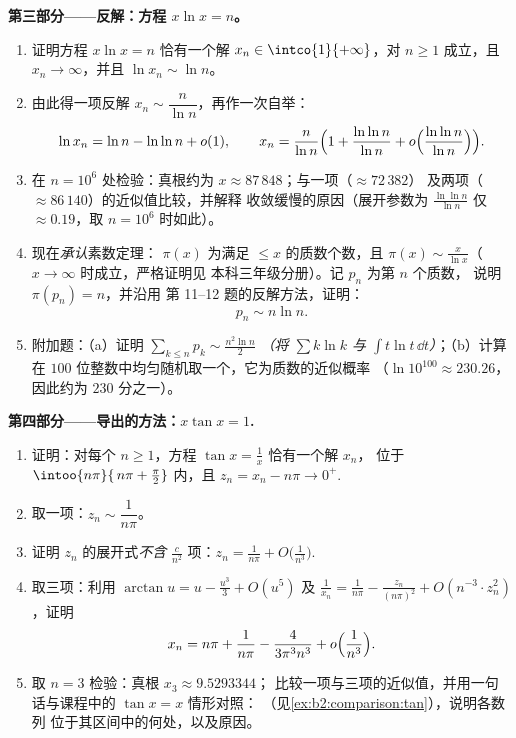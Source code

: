 \begin{problem}
\medskip
\noindent\textbf{第三部分——反解：方程 $x\ln x =
n$。}
\begin{enumerate}[resume]
  \item 证明方程 $x\ln x = n$ 恰有一个解 $x_n \in
        \intco{1}{+\infty}$，对 $n \geq 1$ 成立，且 $x_n \to
        \infty$，并且 $\ln x_n \sim \ln n$。
  \item 由此得一项反解 $x_n \sim
        \dfrac{n}{\ln n}$，再作一次自举：
        \[
        \ln x_n = \ln n - \ln\ln n + o(1),
        \qquad
        x_n = \frac{n}{\ln n}\Bigl(1 + \frac{\ln\ln n}{\ln n}
        + o\Bigl(\frac{\ln\ln n}{\ln n}\Bigr)\Bigr).
        \]
  \item 在 $n = 10^6$ 处检验：真根约为 $x \approx
        87\,848$；与一项（$\approx 72\,382$）
        及两项（$\approx 86\,140$）的近似值比较，并解释
        收敛缓慢的原因（展开参数为 $\frac{\ln\ln
        n}{\ln n}$ 仅 $\approx 0.19$，取 $n = 10^6$ 时如此）。
  \item 现在\emph{承认}素数定理：
        $\pi(x)$ 为满足 $\leq x$ 的质数个数，且 $\pi(x) \sim
        \frac{x}{\ln x}$（$x \to \infty$ 时成立，严格证明见
        本科三年级分册）。记 $p_n$ 为第 $n$ 个质数，
        说明 $\pi(p_n) = n$，并沿用
        第 11--12 题的反解方法，证明：
        \[
        p_n \sim n \ln n .
        \]
  \item 附加题：（a）证明 $\sum_{k \leq n} p_k \sim
        \frac{n^2\ln n}{2}$ \emph{（将 $\sum k\ln k$ 与
        $\int t\ln t\,\dd t$）}；（b）计算
        在 $100$ 位整数中均匀随机取一个，它为质数的近似概率
        （$\ln 10^{100} \approx 230.26$，因此约为
        $230$ 分之一）。
\end{enumerate}

\medskip
\noindent\textbf{第四部分——导出的方法：$x\tan x =
1$.}
\begin{enumerate}[resume]
  \item 证明：对每个 $n \geq 1$，方程 $\tan x =
        \frac1x$ 恰有一个解 $x_n$，
        位于 $\intoo{n\pi}{\,n\pi + \frac\pi2}$ 内，且 $z_n = x_n
        - n\pi \to 0^+$.
  \item 取一项：$z_n \sim \dfrac{1}{n\pi}$。
  \item 证明 $z_n$ 的展开式\emph{不含}
        $\frac{c}{n^2}$ 项：$z_n = \frac1{n\pi} +
        O\bigl(\frac{1}{n^3}\bigr)$.
  \item 取三项：利用 $\arctan u = u - \frac{u^3}3 +
        O(u^5)$ 及 $\frac1{x_n} = \frac{1}{n\pi} -
        \frac{z_n}{(n\pi)^2} + O(n^{-3}\cdot z_n^2)$，证明
        \[
        x_n = n\pi + \frac{1}{n\pi} -
        \frac{4}{3\pi^3 n^3} + o\Bigl(\frac{1}{n^3}\Bigr).
        \]
  \item 取 $n = 3$ 检验：真根 $x_3 \approx 9.5293344$；
        比较一项与三项的近似值，并用一句话与课程中的
        $\tan x = x$ 情形对照：
        （见\cref{ex:b2:comparison:tan}），说明各数列
        位于其区间中的何处，以及原因。
\end{enumerate}


\end{problem}
